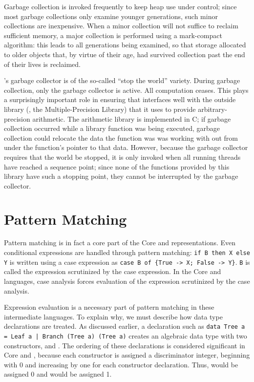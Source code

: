 Garbage collection is invoked frequently to keep heap use under control; since most garbage collections only examine younger generations, such minor collections are inexpensive. When a minor collection will not suffice to reclaim sufficient memory, a major collection is performed using a mark-compact algorithm: this leads to all generations being examined, so that storage allocated to older objects that, by virtue of their age, had survived collection past the end of their lives is reclaimed.

\GHC{}'s garbage collector is of the so-called ``stop the world'' variety. During garbage collection, only the garbage collector is active. All computation ceases. This plays a surprisingly important role in ensuring that \GHC interfaces well with the outside library (, the  Multiple-Precision Library) that it uses to provide arbitrary-precision arithmetic. The arithmetic library is implemented in C; if garbage collection occurred while a library function was being executed, garbage collection could relocate the data the function was was working with out from under the function's pointer to that data. However, because the garbage collector requires that the world be stopped, it is only invoked when all running threads have reached a sequence point; since none of the functions provided by this library have such a stopping point, they cannot be interrupted by the garbage collector.

\section{Pattern Matching}
Pattern matching is in fact a core part of the Core and  representations. Even conditional expressions are handled through pattern matching: \lstinline{if B then X else Y} is written using a case expression as \lstinline|case B of {True -> X; False -> Y}|. \lstinline{B} is called the expression scrutinized by the case expression. In the Core and  languages, case analysis forces evaluation of the expression scrutinized by the case analysis.

Expression evaluation is a necessary part of pattern matching in these intermediate languages. To explain why, we must describe how data type declarations are treated. As discussed earlier, a declaration such as \lstinline{data Tree a = Leaf a | Branch (Tree a) (Tree a)} creates an algebraic data type with two constructors,  and . The ordering of these declarations is considered significant in Core and , because each constructor is assigned a discriminator integer, beginning with 0 and increasing by one for each constructor declaration. Thus,  would be assigned 0 and  would be assigned 1.

